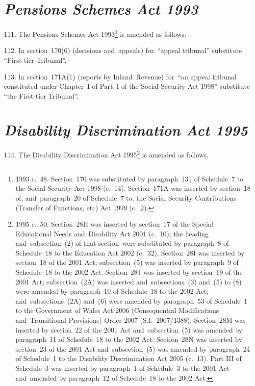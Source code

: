 \documentclass[12pt,a4paper]{article}
\begin{document}
\section*{\itshape Pensions Schemes Act 1993}

111.  The Pensions Schemes Act 1993\footnote{1993 c.~48. Section~170 was substituted by paragraph~131 of Schedule~7 to the Social Security Act 1998 (c.~14). Section~171A was inserted by section~18 of, and~paragraph~20 of Schedule~7 to, the Social Security Contributions (Transfer of Functions, etc) Act 1999 (c.~2).} is amended as follows.

\medskip

112.  In section~170(6) (decisions and~appeals) for~“appeal tribunal” substitute “First-tier Tribunal”.

\medskip

113.  In section~171A(1) (reports by Inland~Revenue) for~“an appeal tribunal constituted under Chapter~I of Part~I of the Social Security Act 1998” substitute “the First-tier Tribunal”.

\section*{\itshape Disability Discrimination Act 1995}

114.  The Disability Discrimination Act 1995\footnote{1995 c.~50. Section~28H was inserted by section~17 of the Special Educational Needs and~Disability Act 2001 (c.~10); the heading and~subsection~(2) of that section~were substituted by paragraph~8 of Schedule~18 to the Education Act 2002 (c.~32). Section~28I was inserted by section~18 of the 2001 Act; subsection~(5) was inserted by paragraph~9 of Schedule~18 to the 2002 Act. Section~28J was inserted by section~19 of the 2001 Act; subsection~(2A) was inserted and~subsections~(3) and~(5) to (8) were amended by paragraph~10 of Schedule~18 to the 2002 Act; and~subsections~(2A) and~(6) were amended by paragraph~53 of Schedule~1 to the Government of Wales Act 2006 (Consequential Modifications and~Transitional Provisions) Order 2007 (S.I.~2007/1388). Section~28M was inserted by section~22 of the 2001 Act and~subsection~(5) was amended by paragraph~11 of Schedule~18 to the 2002 Act. Section~28N was inserted by section~23 of the 2001 Act and~subsection~(5) was amended by paragraph~24 of Schedule~1 to the Disability Discrimination Act 2005 (c.~13). Part III of Schedule~3 was inserted by paragraph~1 of Schedule~3 to the 2001 Act and~amended by paragraph~12 of Schedule~18 to the 2002 Act.} is amended as follows.
\end{document}

